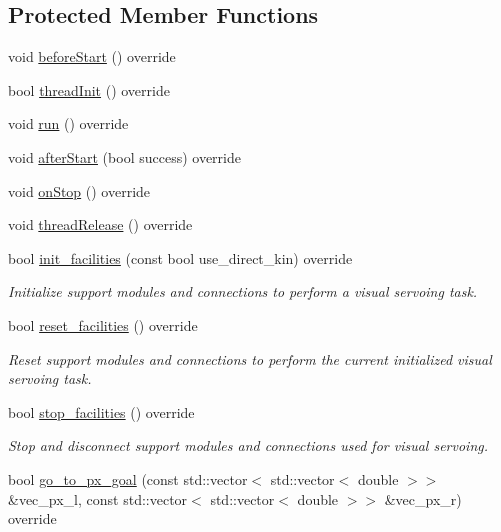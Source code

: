 \subsection*{Protected Member Functions}
\begin{DoxyCompactItemize}
\item 
void \hyperlink{classVisualServoingServer_a4f23c649522804e21c7e60655a5dad99}{before\+Start} () override
\item 
bool \hyperlink{classVisualServoingServer_aa8673d3ac18d4aa4be94e8354ef0bad5}{thread\+Init} () override
\item 
void \hyperlink{classVisualServoingServer_a2397c1d1c5a5c65d1851075947f61f7e}{run} () override
\item 
void \hyperlink{classVisualServoingServer_ae6977911d131001eb4c9a07b83495518}{after\+Start} (bool success) override
\item 
void \hyperlink{classVisualServoingServer_a1401f7ee34d88728dd103439b25f9cf5}{on\+Stop} () override
\item 
void \hyperlink{classVisualServoingServer_a65744a18718c014e19f882dc1052a517}{thread\+Release} () override
\item 
bool \hyperlink{classVisualServoingServer_ad3668e0fc8818f9d2827bbc50087d353}{init\+\_\+facilities} (const bool use\+\_\+direct\+\_\+kin) override
\begin{DoxyCompactList}\small\item\em Initialize support modules and connections to perform a visual servoing task. \end{DoxyCompactList}\item 
bool \hyperlink{classVisualServoingServer_ae397fa9823f425fccf2837122629383f}{reset\+\_\+facilities} () override
\begin{DoxyCompactList}\small\item\em Reset support modules and connections to perform the current initialized visual servoing task. \end{DoxyCompactList}\item 
bool \hyperlink{classVisualServoingServer_ae5e4ac8d334374f2de259a530781443b}{stop\+\_\+facilities} () override
\begin{DoxyCompactList}\small\item\em Stop and disconnect support modules and connections used for visual servoing. \end{DoxyCompactList}\item 
bool \hyperlink{classVisualServoingServer_a6b68da9fe211a5779fc7a24e406dc8f0}{go\+\_\+to\+\_\+px\+\_\+goal} (const std\+::vector$<$ std\+::vector$<$ double $>$$>$ \&vec\+\_\+px\+\_\+l, const std\+::vector$<$ std\+::vector$<$ double $>$$>$ \&vec\+\_\+px\+\_\+r) override

\end{DoxyCompactItemize}

